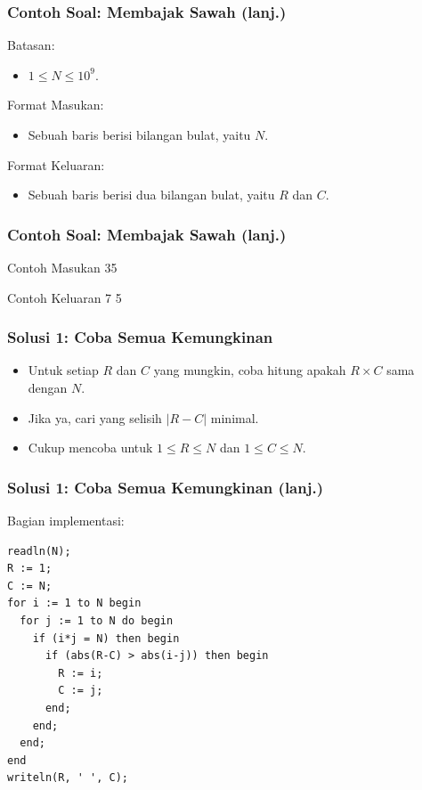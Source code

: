 \documentclass{beamer}
\begin{document}
\begin{frame}
\frametitle{Contoh Soal: Membajak Sawah (lanj.)}
Batasan:
\begin{itemize}
    \item $1 \le N \le 10^9$.
\end{itemize}

\hfill

Format Masukan:
\begin{itemize}
    \item Sebuah baris berisi bilangan bulat, yaitu $N$.
\end{itemize}

\hfill

Format Keluaran:
\begin{itemize}
    \item Sebuah baris berisi dua bilangan bulat, yaitu $R$ dan $C$.
\end{itemize}

\end{frame}

\begin{frame}
\frametitle{Contoh Soal: Membajak Sawah (lanj.)}

\begin{block}{Contoh Masukan}
35
\end{block}

\hfill

\begin{block}{Contoh Keluaran}
7 5
\end{block}

\end{frame}

\begin{frame}
\frametitle{Solusi 1: Coba Semua Kemungkinan}
\begin{itemize}
    \item Untuk setiap $R$ dan $C$ yang mungkin, coba hitung apakah $R \times C$ sama dengan $N$.
    \item Jika ya, cari yang selisih $|R-C|$ minimal.
    \item Cukup mencoba untuk $1 \le R \le N$ dan $1 \le C \le N$.
\end{itemize}
\end{frame}

\begin{frame}[fragile]
\frametitle{Solusi 1: Coba Semua Kemungkinan (lanj.)}
Bagian implementasi:
\begin{lstlisting}
readln(N);
R := 1;
C := N;
for i := 1 to N begin
  for j := 1 to N do begin
    if (i*j = N) then begin
      if (abs(R-C) > abs(i-j)) then begin
        R := i;
        C := j;
      end;
    end;
  end;
end
writeln(R, ' ', C);
\end{lstlisting}
\end{frame}
\end{document}
